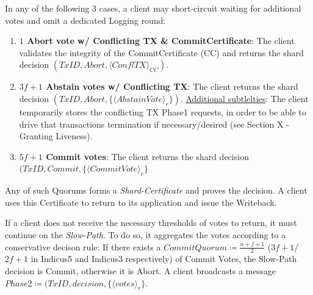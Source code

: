 In any of the following 3 cases, a client may short-circuit waiting for additional votes and omit a dedicated Logging round:
\begin{enumerate}
\item \textbf{$1$ Abort vote w/ Conflicting TX \& CommitCertificate}: The client validates the integrity of the CommitCertificate (CC) and returns the shard decision $(TxID, Abort, \langle ConflTX \rangle_{CC})$.  
\item \textbf{$3f+1$ Abstain votes w/ Conflicting TX}: The client returns the shard decision $(TxID, Abort, \{\langle AbstainVote\rangle_r\})$. 
\underline{Additional subtlelties}: The client temporarily stores the conflicting TX Phase1 requests, in order to be able to drive that transactions termination if necessary/desired (see Section X - Granting Liveness).
\item \textbf{$5f+1$ Commit votes}: The client returns the shard decision $(TxID, Commit, \{\langle CommitVote \rangle_r\}$
\end{enumerate}
Any of such Quorums forms a \textit{Shard-Certificate} and proves the decision. A client uses this Certificate to return to its application and issue the Writeback.

If a client does not receive the necessary thresholds of votes to return, it must continue on the \textit{Slow-Path}. To do so, it aggregates the votes according to a conservative  decison rule:
If there exists a $CommitQuorum \coloneqq \frac{n+f+1}{2}$ ($3f+1$/$2f+1$ in Indicus5 and Indicus3 respectively) of Commit Votes, the Slow-Path decision is Commit, otherwise it is Abort.
A client broadcasts a message $Phase2 \coloneqq (TxID, decision, \{\langle votes \rangle_r\}$.

